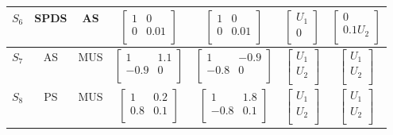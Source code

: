 \begin{table}
\begin{center}
{\begin{tabular}{|c|c|c|c|c|c|c|}
$S_6$   &SPDS          & AS   &$\begin{bmatrix} 1 & 0 \\ 0 &0.01\\\end{bmatrix}$ &$\begin{bmatrix} 1 & 0 \\ 0 &0.01\\\end{bmatrix}$ &$\begin{bmatrix} U_1 \\ 0\\\end{bmatrix}$ &$\begin{bmatrix} 0 \\ 0.1 U_2\\\end{bmatrix}$ \\ \hline
$S_7$   &AS          & MUS   &$\begin{bmatrix} 1 & 1.1 \\ -0.9 &0\\\end{bmatrix}$ &$\begin{bmatrix} 1 & -0.9 \\ -0.8 &0 \\\end{bmatrix}$ &$\begin{bmatrix} U_1 \\ U_2\\\end{bmatrix}$ &$\begin{bmatrix} U_1 \\ U_2\\\end{bmatrix}$ \\ \hline
$S_8$   &PS          & MUS   &$\begin{bmatrix} 1 & 0.2 \\ 0.8 &0.1\\\end{bmatrix}$ &$\begin{bmatrix} 1 & 1.8 \\ -0.8 &0.1\\\end{bmatrix}$ &$\begin{bmatrix} U_1 \\ U_2\\\end{bmatrix}$ &$\begin{bmatrix} U_1 \\ U_2\\\end{bmatrix}$ \\ \hline

\end{tabular}}
\end{center}
\end{table}
